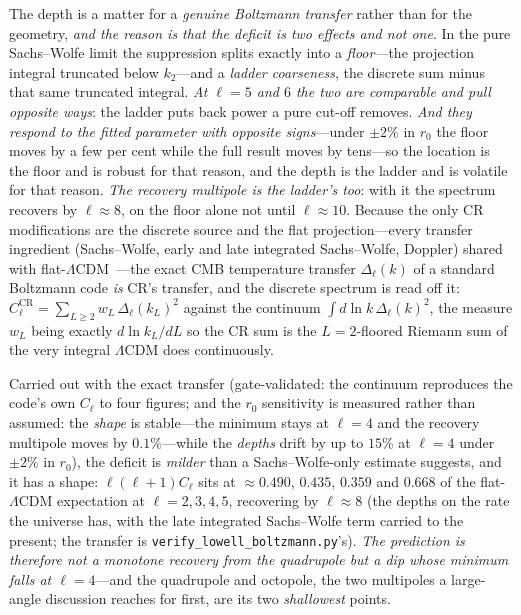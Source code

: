 \documentclass[11pt,a4paper]{article}
\theoremstyle{plain}
\theoremstyle{definition}
\theoremstyle{remark}
\begin{document}
The depth is a matter for a \emph{genuine Boltzmann transfer} rather than for the geometry, \emph{and the reason is that the deficit is two effects and not one}. In the pure Sachs--Wolfe limit the suppression splits exactly into a \emph{floor}---the projection integral truncated below $k_2$---and a \emph{ladder coarseness}, the discrete sum minus that same truncated integral. \emph{At $\ell=5$ and $6$ the two are comparable and pull opposite ways}: the ladder puts back power a pure cut-off removes. \emph{And they respond to the fitted parameter with opposite signs}---under $\pm2\%$ in $r_{0}$ the floor moves by a few per cent while the full result moves by tens---so the location is the floor and is robust for that reason, and the depth is the ladder and is volatile for that reason. \emph{The recovery multipole is the ladder's too}: with it the spectrum recovers by $\ell\approx8$, on the floor alone not until $\ell\approx10$. Because the only CR modifications are the discrete source and the flat projection---every transfer ingredient (Sachs--Wolfe, early and late integrated Sachs--Wolfe, Doppler) shared with flat-$\Lambda$CDM~\cite{JanzenModernParallax}---the exact CMB temperature transfer $\Delta_\ell(k)$ of a standard Boltzmann code \emph{is} CR's transfer, and the discrete spectrum is read off it: $C_\ell^{\mathrm{CR}}=\sum_{L\ge2}w_L\,\Delta_\ell(k_L)^2$ against the continuum $\int d\ln k\,\Delta_\ell(k)^2$, the measure $w_L$ being exactly $d\ln k_L/d L$ so the CR sum is the $L{=}2$-floored Riemann sum of the very integral $\Lambda$CDM does continuously. 

Carried out with the exact transfer (gate-validated: the continuum reproduces the code's own $C_\ell$ to four figures; and the $r_0$ sensitivity is measured rather than assumed: the \emph{shape} is stable---the minimum stays at $\ell=4$ and the recovery multipole moves by $0.1\%$---while the \emph{depths} drift by up to $15\%$ at $\ell=4$ under $\pm2\%$ in $r_0$), the deficit is \emph{milder} than a Sachs--Wolfe-only estimate suggests, and it has a shape: $\ell(\ell+1)C_\ell$ sits at $\approx0.490$, $0.435$, $0.359$ and $0.668$ of the flat-$\Lambda$CDM expectation at $\ell=2,3,4,5$, recovering by $\ell\approx8$ (the depths on the rate the universe has, with the late integrated Sachs--Wolfe term carried to the present; the transfer is \texttt{verify\_lowell\_boltzmann.py}'s). \emph{The prediction is therefore not a monotone recovery from the quadrupole but a dip whose minimum falls at $\ell=4$}---and the quadrupole and octopole, the two multipoles a large-angle discussion reaches for first, are its two \emph{shallowest} points. 
\end{document}
